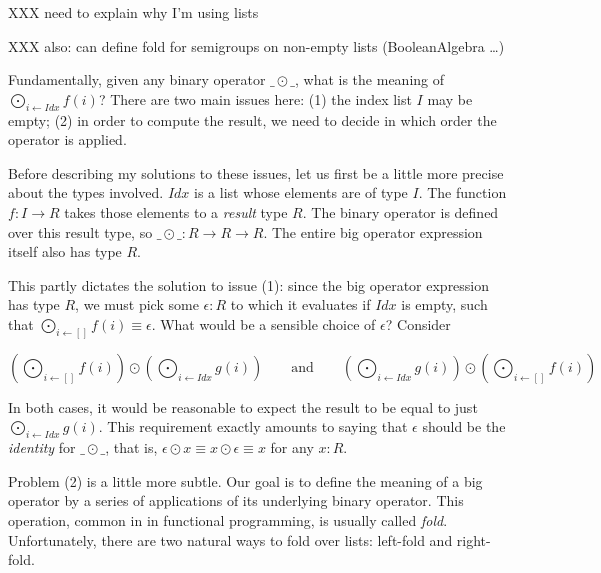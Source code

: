 XXX need to explain why I'm using lists

XXX also: can define fold for semigroups on non-empty lists (BooleanAlgebra \ldots)



Fundamentally, given any binary operator \(\_\!\!\odot\!\!\_\), what is the meaning of \(\bigodot_{i \leftarrow \textit{Idx}} f(i)\)? There are two main issues here: (1) the index list \(I\) may be empty; (2) in order to compute the result, we need to decide in which order the operator is applied.

Before describing my solutions to these issues, let us first be a little more precise about the types involved. \(\textit{Idx}\) is a list whose elements are of type \(I\). The function \(f : I \rightarrow R\) takes those elements to a \emph{result} type \(R\). The binary operator is defined over this result type, so \(\_\!\!\odot\!\!\_ : R \rightarrow R \rightarrow R\). The entire big operator expression itself also has type \(R\).

This partly dictates the solution to issue (1): since the big operator expression has type \(R\), we must pick some \(\epsilon : R\) to which it evaluates if \(\textit{Idx}\) is empty, such that \(\bigodot_{i \leftarrow []} f(i) \equiv \epsilon\). What would be a sensible choice of \(\epsilon\)? Consider

\[
	\left(\bigodot_{i \leftarrow []} f(i) \right) \odot \left(\bigodot_{i \leftarrow \textit{Idx}} g(i)\right)
	\qquad \text{and} \qquad
	\left(\bigodot_{i \leftarrow \textit{Idx}} g(i)\right) \odot \left(\bigodot_{i \leftarrow []} f(i)\right)
\]

In both cases, it would be reasonable to expect the result to be equal to just \(\bigodot_{i \leftarrow \textit{Idx}} g(i)\). This requirement exactly amounts to saying that \(\epsilon\) should be the \emph{identity} for \(\_\!\!\odot\!\!\_\), that is, \(\epsilon \odot x \equiv x \odot \epsilon \equiv x\) for any \(x : R\).

Problem (2) is a little more subtle. Our goal is to define the meaning of a big operator by a series of applications of its underlying binary operator. This operation, common in in functional programming, is usually called \emph{fold}. Unfortunately, there are two natural ways to fold over lists: left-fold and right-fold.

